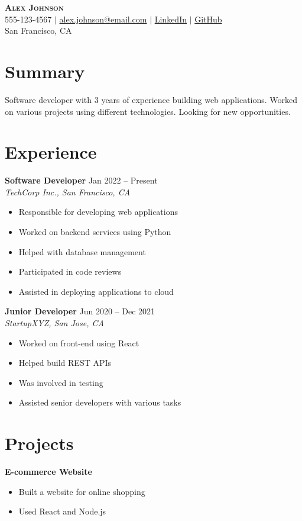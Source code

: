\documentclass[letterpaper,11pt]{article}
\begin{document}
\begin{center}
    \textbf{\Huge \scshape Alex Johnson} \\
    \small 555-123-4567 $|$ \href{mailto:alex.johnson@email.com}{alex.johnson@email.com} $|$
    \href{https://linkedin.com/in/alexjohnson}{LinkedIn} $|$
    \href{https://github.com/alexjohnson}{GitHub} \\
    San Francisco, CA
\end{center}

\section{Summary}
Software developer with 3 years of experience building web applications. Worked on various projects using different technologies. Looking for new opportunities.

\section{Experience}
\textbf{Software Developer} \hfill Jan 2022 -- Present \\
\textit{TechCorp Inc., San Francisco, CA}
\begin{itemize}
    \item Responsible for developing web applications
    \item Worked on backend services using Python
    \item Helped with database management
    \item Participated in code reviews
    \item Assisted in deploying applications to cloud
\end{itemize}

\textbf{Junior Developer} \hfill Jun 2020 -- Dec 2021 \\
\textit{StartupXYZ, San Jose, CA}
\begin{itemize}
    \item Worked on front-end using React
    \item Helped build REST APIs
    \item Was involved in testing
    \item Assisted senior developers with various tasks
\end{itemize}

\section{Projects}
\textbf{E-commerce Website}
\begin{itemize}
    \item Built a website for online shopping
    \item Used React and Node.js
\end{itemize}
\end{document}
